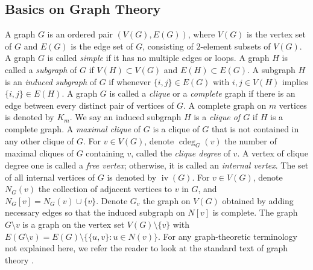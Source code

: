 \documentclass[12pt,reqno]{amsart}
\newcommand \iv{\operatorname{iv}}
\newcommand \cdeg{\operatorname{cdeg}}
\theoremstyle{plain}
\theoremstyle{definition}
\begin{document}
\subsection{Basics on Graph Theory}
A graph $G$ is an ordered pair $(V(G),E(G))$, where $V(G)$ is the vertex set of $G$ and $E(G)$ is the edge set of $G$, consisting of $2$-element subsets of $V(G)$. A graph $G$ is called \emph{simple} if it has no multiple edges or loops. A graph $H$ is called a \emph{subgraph} of $G$ if $V(H)\subset V(G)$ and $E(H)\subset E(G)$. A subgraph $H$ is an \emph{induced subgraph} of $G$ if whenever $\{i,j\}\in E(G)$ with $i,j\in V(H)$ implies $\{i,j\}\in E(H)$. A graph $G$ is called a \emph{clique} or a \emph{complete} graph if there is an edge between every distinct pair of vertices of $G$. A complete graph on $m$ vertices is denoted by $K_m$. We say an induced subgraph $H$ is a \emph{clique of $G$} if $H$ is a complete graph. A \emph{maximal clique} of $G$ is a clique of $G$ that is not contained in any other clique of $G$. For $v\in V(G)$, denote $\cdeg_G(v)$ the number of maximal cliques of $G$ containing $v$, called the \emph{clique degree} of $v$. A vertex of clique degree one is called a \emph{free vertex}; otherwise, it is called an \emph{internal vertex}. The set of all internal vertices of $G$ is denoted by $\iv(G)$. For $v\in V(G)$, denote $N_G(v)$ the collection of adjacent vertices to $v$ in $G$, and $N_G[v]=N_G(v)\cup \{v\}$. Denote $G_v$ the graph on $V(G)$ obtained by adding necessary edges so that the induced subgraph on $N[v]$ is complete. The graph $G\setminus v$ is a graph on the vertex set $V(G)\setminus\{v\}$ with $E(G\setminus v)=E(G)\setminus{\{\{u,v\}: u\in N(v)\}}$. For any graph-theoretic terminology not explained here, we refer the reader to look at the standard text of graph theory \cite{BondyMurty2008}.
\end{document}
